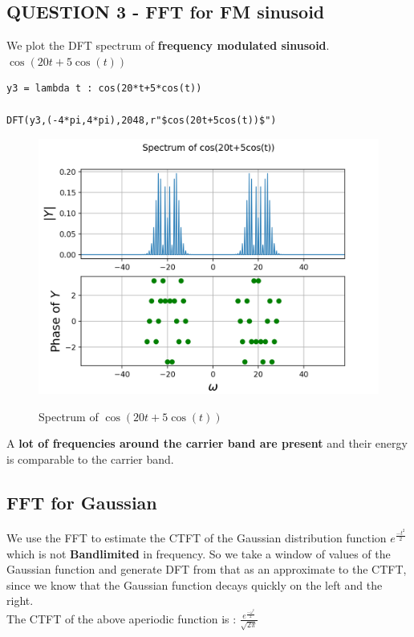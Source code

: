 \documentclass[11pt, a4paper]{article}
\begin{document}
\subsection{QUESTION 3 - FFT for FM sinusoid}
{
We plot the DFT spectrum of \textbf{frequency modulated sinusoid}.
$\cos(20t+5\cos(t))$
}
\begin{verbatim}
y3 = lambda t : cos(20*t+5*cos(t))

DFT(y3,(-4*pi,4*pi),2048,r"$cos(20t+5cos(t))$")
\end{verbatim}
\begin{figure}[H]
   	\centering
   	\includegraphics[scale=0.8]{qn2_FM.png}
   	\label{fig:qn3}
   	\caption{Spectrum of $\cos(20t+5\cos(t))$}
\end{figure}
{
A \textbf{lot of frequencies around the carrier band are present} and their energy is comparable to the carrier band.
}


\subsection{FFT for Gaussian}
{
We use the FFT to estimate the CTFT of the Gaussian distribution function
$e^{\frac{-t^2}{2}}$ which is not \textbf{Bandlimited} in frequency.
So we take a window of values of the Gaussian function and generate DFT from that as an approximate to the CTFT, since we know that the Gaussian function decays quickly on the left and the right. 
\\
The CTFT of the above aperiodic function is :
$\frac{e^{\frac{-\omega^2}{2}}}{\sqrt{2\pi}}$
}
\end{document}
